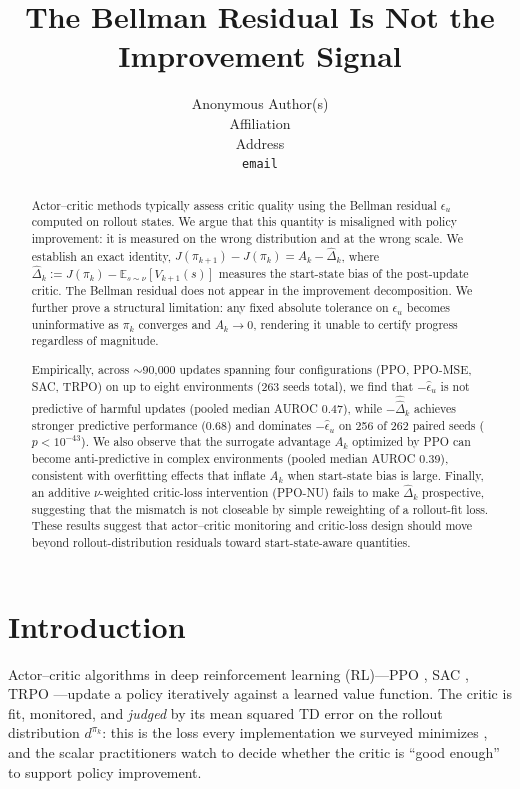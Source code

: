 \documentclass{article}
\title{The Bellman Residual Is Not the Improvement Signal}
\author{%
  Anonymous Author(s) \\
  Affiliation \\
  Address \\
  \texttt{email}
}
\begin{document}
\maketitle

\begin{abstract}
Actor--critic methods typically assess critic quality using the Bellman residual $\epsilon_u$ computed on rollout states. We argue that this quantity is misaligned with policy improvement: it is measured on the wrong distribution and at the wrong scale. We establish an exact identity, $J(\pi_{k+1}) - J(\pi_k) = A_k - \hat\Delta_k$, where $\hat\Delta_k := J(\pi_k) - \mathbb{E}_{s \sim \nu}[V_{k+1}(s)]$ measures the start-state bias of the post-update critic. The Bellman residual does not appear in the improvement decomposition. We further prove a structural limitation: any fixed absolute tolerance on $\epsilon_u$ becomes uninformative as $\pi_k$ converges and $A_k \to 0$, rendering it unable to certify progress regardless of magnitude.

Empirically, across $\sim$90{,}000 updates spanning four configurations (PPO, PPO-MSE, SAC, TRPO) on up to eight environments (263 seeds total), we find that $-\widehat\epsilon_u$ is not predictive of harmful updates (pooled median AUROC 0.47), while $-\widehat{\hat\Delta}_k$ achieves stronger predictive performance (0.68) and dominates $-\widehat\epsilon_u$ on 256 of 262 paired seeds ($p < 10^{-43}$). We also observe that the surrogate advantage $A_k$ optimized by PPO can become anti-predictive in complex environments (pooled median AUROC 0.39), consistent with overfitting effects that inflate $A_k$ when start-state bias is large. Finally, an additive $\nu$-weighted critic-loss intervention (PPO-NU) fails to make $\hat\Delta_k$ prospective, suggesting that the mismatch is not closeable by simple reweighting of a rollout-fit loss. These results suggest that actor--critic monitoring and critic-loss design should move beyond rollout-distribution residuals toward start-state-aware quantities.
\end{abstract}

\section{Introduction}
\label{sec:intro}

Actor--critic algorithms in deep reinforcement learning (RL)---PPO \citep{schulman2017proximal}, SAC \citep{haarnoja2018soft}, TRPO \citep{schulman2015trust}---update a policy iteratively against a learned value function. The critic is fit, monitored, and \emph{judged} by its mean squared TD error on the rollout distribution $d^{\pi_k}$: this is the loss every implementation we surveyed minimizes \citep{huang202237,andrychowicz2021what}, and the scalar practitioners watch to decide whether the critic is ``good enough'' to support policy improvement.
\end{document}
